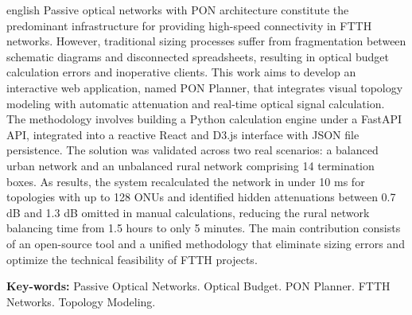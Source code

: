 \begin{resumo}[Abstract]	
\begin{otherlanguage*}{english}
\noindent Passive optical networks with PON architecture constitute the predominant infrastructure for providing high-speed connectivity in FTTH networks. However, traditional sizing processes suffer from fragmentation between schematic diagrams and disconnected spreadsheets, resulting in optical budget calculation errors and inoperative clients. This work aims to develop an interactive web application, named PON Planner, that integrates visual topology modeling with automatic attenuation and real-time optical signal calculation. The methodology involves building a Python calculation engine under a FastAPI API, integrated into a reactive React and D3.js interface with JSON file persistence. The solution was validated across two real scenarios: a balanced urban network and an unbalanced rural network comprising 14 termination boxes. As results, the system recalculated the network in under 10 ms for topologies with up to 128 ONUs and identified hidden attenuations between 0.7 dB and 1.3 dB omitted in manual calculations, reducing the rural network balancing time from 1.5 hours to only 5 minutes. The main contribution consists of an open-source tool and a unified methodology that eliminate sizing errors and optimize the technical feasibility of FTTH projects.

\vspace{0.5cm}
\noindent \textbf{Key-words:} Passive Optical Networks. Optical Budget. PON Planner. FTTH Networks. Topology Modeling.
\end{otherlanguage*}
\end{resumo}
